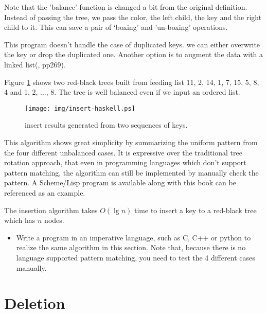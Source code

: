 \documentclass[b5paper]{article}
\begin{document}
Note that the 'balance' function is changed a bit from the original
definition. Instead of passing the tree, we pass
the color, the left child, the key and the right child to it.
This can save a pair of `boxing' and 'un-boxing' operations.

This program doesn't handle the case of duplicated keys. we can
either overwrite the key or drop the duplicated one.
Another option is to augment the data with a linked list(\cite{CLRS}, pp269).

Figure \ref{fig:insert-example} shows two red-black trees
built from feeding list 11, 2, 14, 1, 7, 15, 5, 8, 4 and 1, 2, ..., 8. The tree is well balanced even if we input an ordered list.

\begin{figure}[htbp]
  \centering
  \texttt{[image: img/insert-haskell.ps]}
  \caption{insert results generated from two sequences of keys.} \label{fig:insert-example}
\end{figure}

This algorithm shows great simplicity by summarizing the uniform pattern
from the four different unbalanced cases. It is expressive over
the traditional tree rotation approach, that even in programming languages
which don't support pattern matching, the algorithm can still be
implemented by manually check the pattern. A Scheme/Lisp program
is available along with this book can be referenced as an example.

The insertion algorithm takes $O(\lg n)$ time to insert a key to
a red-black tree which has $n$ nodes.

\begin{Exercise}

\begin{itemize}
\item Write a program in an imperative language, such as
C, C++ or python to realize the same algorithm in this
section. Note that, because there is no language supported
pattern matching, you need to test the 4 different cases
manually.
\end{itemize}

\end{Exercise}


\section{Deletion}
\end{document}
